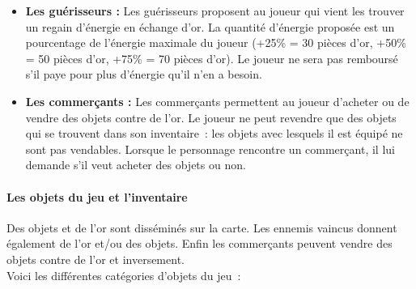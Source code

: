 \documentclass[11pt]{article}
\begin{document}
\begin{itemize}
   \item \textbf{Les guérisseurs : }Les guérisseurs proposent au joueur qui vient les trouver un regain d'énergie en échange d'or. La quantité d'énergie proposée est un pourcentage de l'énergie maximale du joueur (+25\% = 30 pièces d'or, +50\% = 50 pièces d'or, +75\% = 70 pièces d'or). Le joueur ne sera pas remboursé s'il paye pour plus d'énergie qu'il n'en a besoin.
   \item \textbf{Les commerçants : }Les commerçants permettent au joueur d'acheter ou de vendre des objets contre de l'or. Le joueur ne peut revendre que des objets qui se trouvent dans son inventaire~: les objets avec lesquels il est équipé ne sont pas vendables. Lorsque le personnage rencontre un commerçant, il lui demande s’il veut acheter des objets ou non. 
\end{itemize}

\paragraph{Les objets du jeu et l'inventaire}

Des objets et de l'or sont disséminés sur la carte. Les ennemis vaincus donnent également de l'or et/ou des objets. Enfin les commerçants peuvent vendre des objets contre de l'or et inversement.\\
Voici les différentes catégories d'objets du jeu~:
\end{document}
